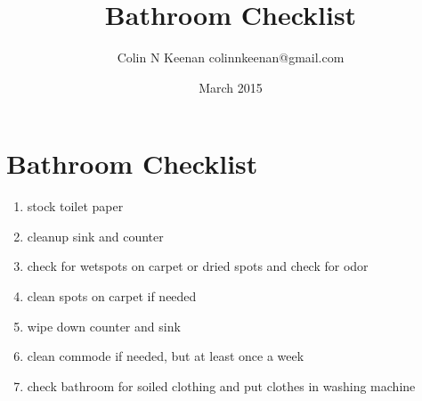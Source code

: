 \documentclass[12pt,letterpaper]{article}
\newcommand{\mytitle}{Bathroom Checklist}
\begin{document}
\title{\mytitle{}}
\author{Colin N Keenan colinnkeenan@gmail.com}
\date{March 2015}
\section*{\mytitle{}}
\noindent \hrulefill
\begin{enumerate}
	\item stock toilet paper
	\item cleanup sink and counter
	\item check for wetspots on carpet or dried spots and check for odor
	\item clean spots on carpet if needed
	\item wipe down counter and sink
	\item clean commode if needed, but at least once a week
	\item check bathroom for soiled clothing and put clothes in washing machine
\end{enumerate}
\end{document}
